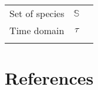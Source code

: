 \begin{longtable}[]{@{}ccl@{}}
\begin{minipage}[t]{0.25\columnwidth}\centering
Set of species\strut
\end{minipage} & \begin{minipage}[t]{0.23\columnwidth}\centering
\(\mathbb{S}\)\strut
\end{minipage} & \begin{minipage}[t]{0.42\columnwidth}\raggedright
\strut
\end{minipage}\tabularnewline
\begin{minipage}[t]{0.25\columnwidth}\centering
Time domain\strut
\end{minipage} & \begin{minipage}[t]{0.23\columnwidth}\centering
\(\tau\)\strut
\end{minipage} & \begin{minipage}[t]{0.42\columnwidth}\raggedright
\strut
\end{minipage}\tabularnewline
\begin{minipage}[t]{0.25\columnwidth}\centering
\strut
\end{minipage} & \begin{minipage}[t]{0.23\columnwidth}\centering
\strut
\end{minipage} & \begin{minipage}[t]{0.42\columnwidth}\raggedright
\strut
\end{minipage}\tabularnewline
\bottomrule
\end{longtable}

\pagebreak

\hypertarget{references}{%
\section{References}\label{references}}
